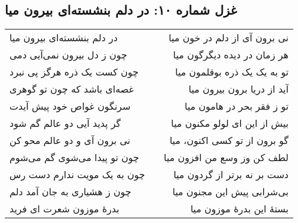 \begin{center}
\section*{غزل شماره ۱۰: در دلم بنشسته‌ای بیرون میا}
\label{sec:010}
\begin{longtable}{l p{0.5cm} r}
در دلم بنشسته‌ای بیرون میا
&&
نی برون آی از دلم در خون میا
\\
چون ز دل بیرون نمی‌آیی دمی
&&
هر زمان در دیده دیگرگون میا
\\
چون کست یک ذره هرگز پی نبرد
&&
تو به یک یک ذره بوقلمون میا
\\
غصه‌ای باشد که چون تو گوهری
&&
آید از دریا برون بیرون میا
\\
سرنگون غواص خود پیش آیدت
&&
تو ز فقر بحر در هامون میا
\\
گر پدید آیی دو عالم گم شود
&&
بیش از این ای لولو مکنون میا
\\
نی برون آی و دو عالم محو کن
&&
گو برون از تو کسی اکنون، میا
\\
چون تو پیدا می‌شوی گم می‌شوم
&&
لطف کن وز وسع من افزون میا
\\
چون به یک مویت ندارم دست رس
&&
دست بر نه برتر از گردون میا
\\
چون ز هشیاری به جان آمد دلم
&&
بی‌شرابی پیش این مجنون میا
\\
بدرهٔ موزون شعرت ای فرید
&&
بستهٔ این بدرهٔ موزون میا
\\
\end{longtable}
\end{center}
